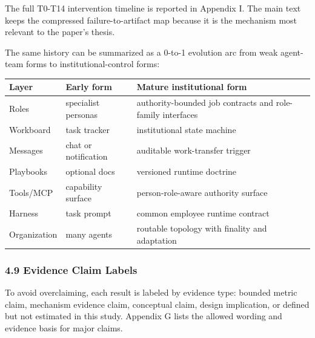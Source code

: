 \documentclass[
]{article}
\newcounter{none} %
\begin{document}
The full T0-T14 intervention timeline is reported in Appendix I. The main text keeps the compressed failure-to-artifact map because it is the mechanism most relevant to the paper's thesis.

The same history can be summarized as a 0-to-1 evolution arc from weak agent-team forms to institutional-control forms:

{\def\LTcaptype{none} %
\begin{longtable}[]{@{}
  >{\raggedright\arraybackslash}p{}
  >{\raggedright\arraybackslash}p{}
  >{\raggedright\arraybackslash}p{}@{}}
\toprule\noalign{}
\begin{minipage}[b]{\linewidth}\raggedright
Layer
\end{minipage} & \begin{minipage}[b]{\linewidth}\raggedright
Early form
\end{minipage} & \begin{minipage}[b]{\linewidth}\raggedright
Mature institutional form
\end{minipage} \\
\midrule\noalign{}
\endhead
\bottomrule\noalign{}
\endlastfoot
Roles & specialist personas & authority-bounded job contracts and role-family interfaces \\
Workboard & task tracker & institutional state machine \\
Messages & chat or notification & auditable work-transfer trigger \\
Playbooks & optional docs & versioned runtime doctrine \\
Tools/MCP & capability surface & person-role-aware authority surface \\
Harness & task prompt & common employee runtime contract \\
Organization & many agents & routable topology with finality and adaptation \\
\end{longtable}
}

\subsubsection{4.9 Evidence Claim Labels}\label{evidence-claim-labels}

To avoid overclaiming, each result is labeled by evidence type: bounded metric claim, mechanism evidence claim, conceptual claim, design implication, or defined but not estimated in this study. Appendix G lists the allowed wording and evidence basis for major claims.
\end{document}
